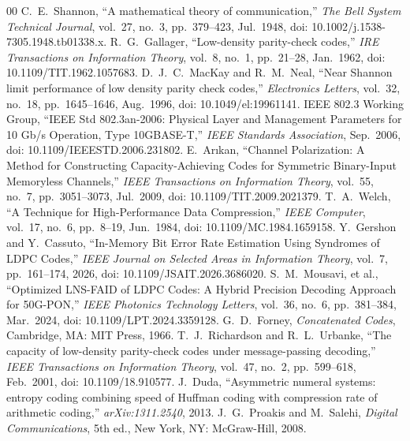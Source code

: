 \documentclass[conference]{IEEEtran}
\begin{document}
\begin{thebibliography}{00}
 C.~E.~Shannon, ``A mathematical theory of communication,'' \textit{The Bell System Technical Journal}, vol.~27, no.~3, pp.~379--423, Jul.~1948, doi: 10.1002/j.1538-7305.1948.tb01338.x.
 R.~G.~Gallager, ``Low-density parity-check codes,'' \textit{IRE Transactions on Information Theory}, vol.~8, no.~1, pp.~21--28, Jan.~1962, doi: 10.1109/TIT.1962.1057683.
 D.~J.~C.~MacKay and R.~M.~Neal, ``Near Shannon limit performance of low density parity check codes,'' \textit{Electronics Letters}, vol.~32, no.~18, pp.~1645--1646, Aug.~1996, doi: 10.1049/el:19961141.
 IEEE 802.3 Working Group, ``IEEE Std 802.3an-2006: Physical Layer and Management Parameters for 10 Gb/s Operation, Type 10GBASE-T,'' \textit{IEEE Standards Association}, Sep.~2006, doi: 10.1109/IEEESTD.2006.231802.
 E.~Ar{\i}kan, ``Channel Polarization: A Method for Constructing Capacity-Achieving Codes for Symmetric Binary-Input Memoryless Channels,'' \textit{IEEE Transactions on Information Theory}, vol.~55, no.~7, pp.~3051--3073, Jul.~2009, doi: 10.1109/TIT.2009.2021379.
 T.~A.~Welch, ``A Technique for High-Performance Data Compression,'' \textit{IEEE Computer}, vol.~17, no.~6, pp.~8--19, Jun.~1984, doi: 10.1109/MC.1984.1659158.
 Y.~Gershon and Y.~Cassuto, ``In-Memory Bit Error Rate Estimation Using Syndromes of LDPC Codes,'' \textit{IEEE Journal on Selected Areas in Information Theory}, vol.~7, pp.~161--174, 2026, doi: 10.1109/JSAIT.2026.3686020.
 S.~M.~Mousavi, et al., ``Optimized LNS-FAID of LDPC Codes: A Hybrid Precision Decoding Approach for 50G-PON,'' \textit{IEEE Photonics Technology Letters}, vol.~36, no.~6, pp.~381--384, Mar.~2024, doi: 10.1109/LPT.2024.3359128.
 G.~D.~Forney, \textit{Concatenated Codes}, Cambridge, MA: MIT Press, 1966.
 T.~J.~Richardson and R.~L.~Urbanke, ``The capacity of low-density parity-check codes under message-passing decoding,'' \textit{IEEE Transactions on Information Theory}, vol.~47, no.~2, pp.~599--618, Feb.~2001, doi: 10.1109/18.910577.
 J.~Duda, ``Asymmetric numeral systems: entropy coding combining speed of Huffman coding with compression rate of arithmetic coding,'' \textit{arXiv:1311.2540}, 2013.
 J.~G.~Proakis and M.~Salehi, \textit{Digital Communications}, 5th ed., New York, NY: McGraw-Hill, 2008.
\end{thebibliography}
\end{document}

